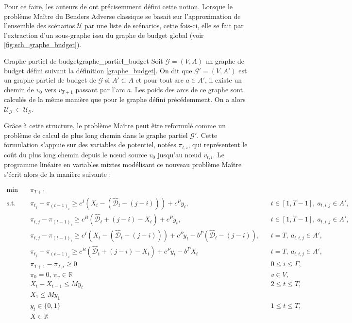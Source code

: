 \documentclass[12pt, a4paper, twoside]{report}
\numberwithin{equation}{section}
\begin{document}
	Pour ce faire, les auteurs de \cite{portoleau:tel-04631599} ont précisemment défini cette notion. Lorsque le problème Maître du Benders Adverse classique se basait sur l'approximation de l'ensemble des scénarios $\mathcal{U}$ par une liste de scénarios, cette fois-ci, elle se fait par l'extraction d'un sous-graphe issu du graphe de budget global (voir \ref{fig:sch_graphe_budget}).
	
	\begin{definition}{Graphe partiel de budget}{graphe_partiel_budget}
		Soit $\mathcal{G}=(V, A)$ un graphe de budget défini suivant la définition \ref{graphe_budget}. On dit que $\mathcal{G}'=(V, A')$ est un graphe partiel de budget de $\mathcal{G}$ si $A'\subset A$ et pour tout arc $a\in A'$, il existe un chemin de $v_0$ vers $v_{T+1}$ passant par l'arc $a$. Les poids des arcs de ce graphe sont calculés de la même manière que pour le graphe défini précédemment. On a alors $\mathcal{U}_{\mathcal{G}'}\subset \mathcal{U}_{\mathcal{G}}$.
	\end{definition}
	
	Grâce à cette structure, le problème Maître peut être reformulé comme un problème de calcul de plus long chemin dans le graphe partiel $\mathcal{G}'$. Cette formulation s'appuie sur des variables de potentiel, notées $\pi_{t,i}$, qui représentent le coût du plus long chemin depuis le nœud source $v_0$ jusqu'au nœud $v_{t,i}$. Le programme linéaire en variables mixtes modélisant ce nouveau problème Maître s'écrit alors de la manière suivante :
	
	\begin{align}
		\min\quad & \pi_{T+1}\\
		\text{s.t.}\quad &\pi_{t_j}-\pi_{(t-1)_i} \geq c^I\left(X_t-(\hat{\mathcal{D}}_t-(j-i))\right)+c^P y_t, &&t\in[1,T-1],\ a_{t,i,j}\in A',\\
		&\pi_{t,j}-\pi_{(t-1)_i} \ge c^B\left(\hat{\mathcal{D}}_t+(j-i)-X_t\right)+c^P y_t, &&t\in[1,T-1],\ a_{t,i,j}\in A',\\
		&\pi_{t,j}-\pi_{(t-1)_i} \ge c^I\left(X_t-(\hat{\mathcal{D}}_t-(j-i))\right) +c^P y_t -b^P(\hat{\mathcal{D}}_t-(j-i)), &&t=T,\ a_{t,i,j}\in A',\\
		&\pi_{t_j}-\pi_{(t-1)_i} \geq c^B(\hat{\mathcal{D}}_t + (j-i)-X_t)+c^Py_t-b^PX_t && t=T,\ a_{t,i,j}\in A',\\
		& \pi_{T+1}-\pi_{T, i}\geq 0 && 0\leq i\leq \Gamma,\\
		&\pi_0=0,\, \pi_v\in\mathbb{R} && v\in V,\\
		&X_t-X_{t-1}\leq My_t && 2\leq t \leq T,\\
		& X_1 \leq My_1\\
		& y_t \in \{0, 1\} && 1\leq t\leq T,\\
		& X\in\mathbb{X}
	\end{align}
	
\end{document}
